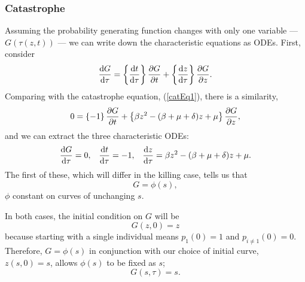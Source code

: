 \subsubsection*{Catastrophe}
Assuming the probability generating function changes with only  one variable --- $G(\tau(z, t))$ --- we can write down the characteristic equations as ODEs. First, consider
\begin{equation*}
\displaystyle\frac{{\rm d} G}{{\rm d} \tau} =  \left\{\displaystyle\frac{{\rm d} t}{{\rm d} \tau}\right\}  \displaystyle\frac{\partial G}{\partial t}+ \left\{\displaystyle\frac{{\rm d} z}{{\rm d} \tau} \right\}\displaystyle\frac{\partial G}{\partial z}.
\end{equation*}
Comparing with the catastrophe equation, (\ref{catEq1}), there is a similarity,
$$0=  \left\{- 1\right\}\displaystyle\frac{\partial G}{\partial t} + \left\{\beta z^2 -( \beta + \mu + \delta)z + \mu\right\} \displaystyle\frac{\partial G}{\partial z},$$
and we can extract the three characteristic ODEs:
\begin{align*}
\label{Char1}
\displaystyle\frac{{\rm d} G}{{\rm d} \tau} = 0,&& \displaystyle\frac{{\rm d} t}{{\rm d} \tau} = -1, && \displaystyle\frac{{\rm d} z}{{\rm d} \tau} = \beta z^2 - (\beta + \mu + \delta)z + \mu.
\end{align*}
The first of these, which will differ in the killing case, tells us that  
$$G = \phi{(s)},$$
$\phi$ constant on curves of unchanging $s$.\par
In both cases, the initial condition on $G$ will be $$G(z, 0) = z$$ because starting with a single individual means $p_1(0) =1$ and $p_{i\neq1}(0) = 0$. Therefore, $G = \phi{(s)}$ in conjunction with our choice of initial curve, $z(s, 0) = s$, allows $\phi(s)$ to be fixed as $s$;
$$G(s,\tau) = s.$$\par

